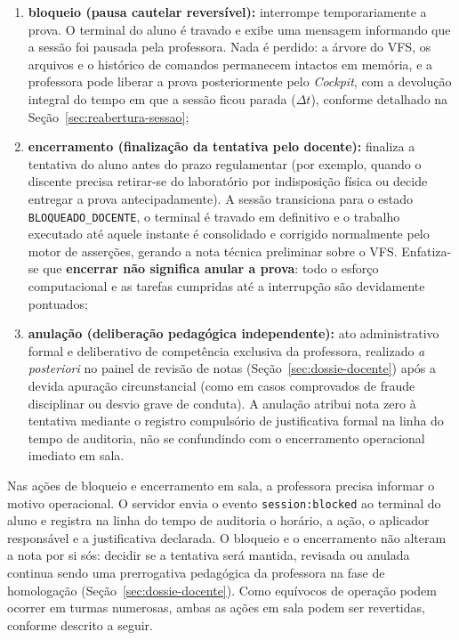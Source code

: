 \begin{enumerate}
    \item \textbf{bloqueio (pausa cautelar reversível):} interrompe temporariamente a prova. O terminal do aluno é travado e exibe uma mensagem informando que a sessão foi pausada pela professora. Nada é perdido: a árvore do VFS, os arquivos e o histórico de comandos permanecem intactos em memória, e a professora pode liberar a prova posteriormente pelo \textit{Cockpit}, com a devolução integral do tempo em que a sessão ficou parada ($\Delta t$), conforme detalhado na Seção~\ref{sec:reabertura-sessao};
    \item \textbf{encerramento (finalização da tentativa pelo docente):} finaliza a tentativa do aluno antes do prazo regulamentar (por exemplo, quando o discente precisa retirar-se do laboratório por indisposição física ou decide entregar a prova antecipadamente). A sessão transiciona para o estado \texttt{BLOQUEADO\_DOCENTE}, o terminal é travado em definitivo e o trabalho executado até aquele instante é consolidado e corrigido normalmente pelo motor de asserções, gerando a nota técnica preliminar sobre o VFS. Enfatiza-se que \textbf{encerrar não significa anular a prova}: todo o esforço computacional e as tarefas cumpridas até a interrupção são devidamente pontuados;
    \item \textbf{anulação (deliberação pedagógica independente):} ato administrativo formal e deliberativo de competência exclusiva da professora, realizado \textit{a posteriori} no painel de revisão de notas (Seção~\ref{sec:dossie-docente}) após a devida apuração circunstancial (como em casos comprovados de fraude disciplinar ou desvio grave de conduta). A anulação atribui nota zero à tentativa mediante o registro compulsório de justificativa formal na linha do tempo de auditoria, não se confundindo com o encerramento operacional imediato em sala.
\end{enumerate}

Nas ações de bloqueio e encerramento em sala, a professora precisa informar o motivo operacional. O servidor envia o evento \texttt{session:blocked} ao terminal do aluno e registra na linha do tempo de auditoria o horário, a ação, o aplicador responsável e a justificativa declarada. O bloqueio e o encerramento não alteram a nota por si sós: decidir se a tentativa será mantida, revisada ou anulada continua sendo uma prerrogativa pedagógica da professora na fase de homologação (Seção~\ref{sec:dossie-docente}). Como equívocos de operação podem ocorrer em turmas numerosas, ambas as ações em sala podem ser revertidas, conforme descrito a seguir.

